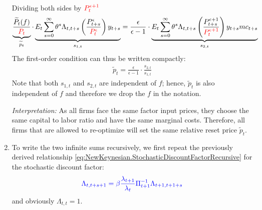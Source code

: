 \begin{enumerate}
\begin{align*}
\end{align*}
Dividing both sides by $\color{red}{P_t^{\epsilon+1}}$
\begin{align*}
\underbrace{\frac{\widetilde{P}_t(f)}{\color{red}{P_t}}}_{\widetilde{p}_t} \cdot  \underbrace{E_t\sum_{s=0}^{\infty}\theta^s \Lambda_{t,t+s} \left(\frac{P_{t+s}^{\epsilon}}{\color{red}{P_t^{\epsilon}}}\right) y_{t+s}}_{s_{1,t}}
=
\frac{\epsilon}{\epsilon-1} \cdot \underbrace{E_t \sum_{s=0}^{\infty}\theta^s \Lambda_{t,t+s} \left(\frac{P_{t+s}^{\epsilon+1}}{\color{red}{P_t^{\epsilon+1}}}\right) y_{t+s} mc_{t+s}}_{s_{2,t}}
\end{align*}
The first-order condition can thus be written compactly: 
\begin{align*}
\widetilde{p}_t = \frac{\epsilon}{\epsilon-1} \cdot \frac{s_{2,t}}{s_{1,t}}
\end{align*}
Note that both $s_{1,t}$ and $s_{2,t}$ are independent of $f$; hence, $\widetilde{p}_t$ is also independent of $f$ and therefore we drop the $f$ in the notation.

\emph{Interpretation:} As all firms face the same factor input prices, they choose the same capital to labor ratio and have the same marginal costs.
Therefore, all firms that are allowed to re-optimize will set the same relative reset price $\widetilde{p}_t$.
  

\item To write the two infinite sums recursively,
  we first repeat the previously derived relationship \eqref{eq:NewKeynesian.StochasticDiscountFactorRecursive} for the stochastic discount factor:
\begin{align*}
\color{blue} \Lambda_{t,t+s+1} = \beta \frac{\lambda_{t+1}}{\lambda_t} \Pi_{t+1}^{-1} \Lambda_{t+1,t+1+s}
\end{align*}
and obviously $\Lambda_{t,t}=1$.
  

\end{enumerate}
